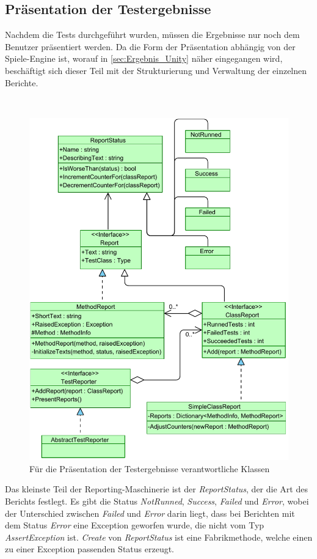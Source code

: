 \subsection{Präsentation der Testergebnisse}

Nachdem die Tests durchgeführt wurden, müssen die Ergebnisse nur noch dem Benutzer präsentiert werden. Da die Form der Präsentation abhängig von der Spiele-Engine ist, worauf in \autoref{sec:Ergebnis_Unity} näher eingegangen wird, beschäftigt sich dieser Teil mit der Strukturierung und Verwaltung der einzelnen Berichte.

~

\begin{figure}[h]
\centering
\includegraphics[width=0.8\linewidth]{images/Kapitel_Ergebnis/ReportersAndReports}
\caption[Für die Präsentation der Testergebnisse verantwortliche Klassen]{Für die Präsentation der Testergebnisse verantwortliche Klassen}
\label{fig:ReportersAndReports}
\end{figure}
\clearpage

Das kleinste Teil der Reporting-Maschinerie ist der \textit{ReportStatus}, der die Art des Berichts festlegt. Es gibt die Status \textit{NotRunned}, \textit{Success}, \textit{Failed} und \textit{Error}, wobei der Unterschied zwischen \textit{Failed} und \textit{Error} darin liegt, dass bei Berichten mit dem Status \textit{Error} eine Exception geworfen wurde, die nicht vom Typ \textit{AssertException} ist. \textit{Create} von \textit{ReportStatus} ist eine Fabrikmethode, welche einen zu einer Exception passenden Status erzeugt.

